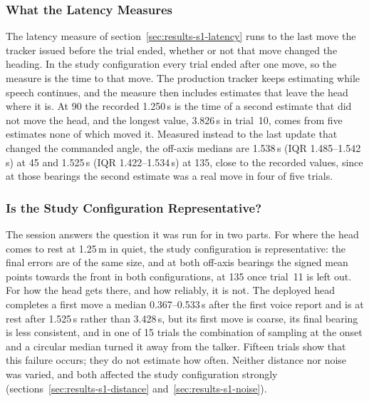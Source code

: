 \subsubsection{What the Latency Measures}

The latency measure of section~\ref{sec:results-s1-latency} runs to the last
move the tracker issued before the trial ended, whether or not that move changed
the heading. In the study configuration every trial ended after one move, so the
measure is the time to that move. The production tracker keeps estimating while
speech continues, and the measure then includes estimates that leave the head
where it is. At 90\textdegree{} the recorded 1.250\,s is the time of a second
estimate that did not move the head, and the longest value, 3.826\,s in
trial~10, comes from five estimates none of which moved it. Measured instead to
the last update that changed the commanded angle, the off-axis medians are
1.538\,s (IQR 1.485--1.542\,s) at 45\textdegree{} and 1.525\,s (IQR
1.422--1.534\,s) at 135\textdegree{}, close to the recorded values, since at
those bearings the second estimate was a real move in four of five trials.

\subsubsection{Is the Study Configuration Representative?}

The session answers the question it was run for in two parts. For where the head
comes to rest at 1.25\,m in quiet, the study configuration is representative:
the final errors are of the same size, and at both off-axis bearings the signed
mean points towards the front in both configurations, at 135\textdegree{} once
trial~11 is left out. For how the head gets
there, and how reliably, it is not. The deployed head completes a first move a
median 0.367--0.533\,s after the first voice report and is at rest after
1.525\,s rather than 3.428\,s, but its first move is coarse, its final bearing
is less consistent, and in one of 15 trials the combination of sampling at the
onset and a circular median turned it away from the talker. Fifteen trials show
that this failure occurs; they do not estimate how often. Neither distance nor
noise was varied, and both affected the study configuration strongly
(sections~\ref{sec:results-s1-distance} and~\ref{sec:results-s1-noise}).


